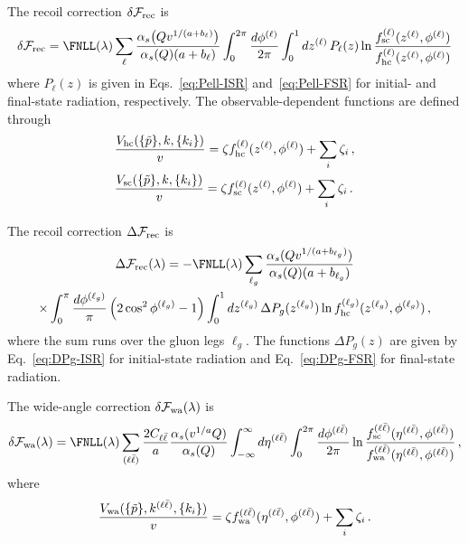 The recoil correction $\delta\mathcal{F}_{\rm rec}$ is
\begin{equation}
  \label{eq:dFrec-general-add}
  \delta\mathcal{F}_{\rm rec} = \FNLL(\lambda)
  \sum_\ell 
  \frac{\alpha_s\!\left(Qv^{1/(a+b_\ell)}\right)}
       {\alpha_s(Q)(a+b_\ell)}
 \int_0^{2\pi} \frac{d\phi^{(\ell)}}{2\pi}\int_0^1 dz^{(\ell)}\,P_\ell(z)\ln \frac{f_{\rm sc}^{(\ell)}(z^{(\ell)},\phi^{(\ell)})}{f_{\rm hc}^{(\ell)}(z^{(\ell)},\phi^{(\ell)})}
\end{equation}
where $P_{\ell}(z)$ is given in Eqs.~\eqref{eq:Pell-ISR} and~\eqref{eq:Pell-FSR}
for initial- and final-state radiation, respectively. 
The observable-dependent functions are defined through
\begin{subequations}
\begin{align}
&\frac{V_{\rm hc}(\{\tilde{p}\},k,\{k_i\})}{v}=\zeta f_{\rm hc}^{(\ell)}(z^{(\ell)},\phi^{(\ell)})+\sum_i\zeta_i\,,\\
&\frac{V_{\rm sc}(\{\tilde{p}\},k,\{k_i\})}{v}=\zeta f_{\rm sc}^{(\ell)}(z^{(\ell)},\phi^{(\ell)})+\sum_i\zeta_i\,.
\end{align}
\end{subequations}

The recoil correction $\Delta\mathcal{F}_{\rm rec}$ is
\begin{multline}
 \label{eq:DFrec-general-add}
	\Delta\mathcal{F}_{\rm rec}(\lambda)=-\FNLL(\lambda)\sum_{\ell_g}\frac{\alpha_s(Qv^{1/(a+b_{\ell_g})})}{\alpha_s(Q)(a+b_{\ell_g})}\\\times\int_0^{\pi}\frac{d\phi^{(\ell_g)}}{\pi}\left(2\cos^2\phi^{(\ell_g)}-1\right)\int_0^1dz^{(\ell_g)}\, \Delta P_g(z^{(\ell_g)})\ln f_{\rm hc}^{(\ell_g)}(z^{(\ell_g)},\phi^{(\ell_g)})\,,
\end{multline}
where the sum runs over the gluon legs $\ell_g$. The functions
$\Delta P_g(z)$ are given by Eq.~\eqref{eq:DPg-ISR} for initial-state
radiation and Eq.~\eqref{eq:DPg-FSR} for final-state radiation.

The wide-angle correction $\delta\mathcal{F}_{\rm wa}(\lambda)$ is
\begin{equation}
 \label{eq:dFwa-general-add}
	\delta\mathcal{F}_{\rm wa}(\lambda)=\FNLL(\lambda)
	\sum_{(\ell\bar\ell)}\frac{2C_{\ell\bar\ell}}{a}\frac{\alpha_s(v^{1/a}Q)}{\alpha_s(Q)}\int_{-\infty}^{\infty}d\eta^{(\ell\bar\ell)}\int_0^{2\pi}\frac{d\phi^{(\ell\bar\ell)}}{2\pi}\ln\frac{f_{\rm sc}^{(\ell\bar\ell)}(\eta^{(\ell\bar\ell)},\phi^{(\ell\bar\ell)})}{f_{\rm wa}^{(\ell\bar\ell)}(\eta^{(\ell\bar\ell)},\phi^{(\ell\bar\ell)})}\,,
\end{equation}
where
\begin{equation}
	\frac{V_{\rm wa}(\{\tilde{p}\},k^{(\ell\bar\ell)},\{k_i\})}{v}=\zeta f_{\rm wa}^{(\ell\bar\ell)}(\eta^{(\ell\bar\ell)},\phi^{(\ell\bar\ell)})+\sum_i\zeta_i\,.
\end{equation}

